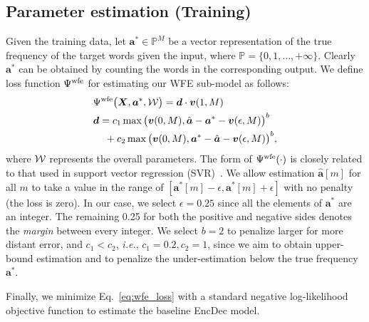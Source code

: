 \documentclass[11pt]{article}
\begin{document}
\subsection{Parameter estimation (Training)}
Given the training data, let $\bm{a}^{*}\in \mathbb{P}^{M}$ be a vector representation of the true frequency of the target words given the input, where $\mathbb{P}=\{0,1,\dots,+\infty\}$. 
Clearly $\bm{a}^{*}$ can be obtained by counting the words in the corresponding output.
We define loss function $ \Psi^{\rm wfe }$ for estimating our WFE sub-model as follows:
\begin{align}
&
 \displaystyle
 \Psi^{\rm wfe } 
 \big(  
 {\bm X},
 \bm{a}^{*}, 
 {\cal W}
 \big)   
 = \displaystyle
 \bm{d}\cdot \bm{v}(1,M)
\label{eq:wfe_loss}
 \\
 &
 \bm{d}
 =
 c_1 \max\big(\bm{v}(0,M), 
 \hat{\bm{a}}
 -
 \bm{a}^{*} 
 - \bm{v}(\epsilon,M)
 \big)^{b}
 \nonumber\\
 &
\,\,\,\,\,\,\, +
 c_2\max\big(\bm{v}(0,M), 
 \bm{a}^{*} 
 -
 \hat{\bm{a}}
 - \bm{v}(\epsilon,M)
 \big)^{b}
 ,
 \nonumber
\end{align}
where $ {\cal W}$ represents the overall parameters.
The form of $\Psi^{\rm wfe}(\cdot)$ is closely related to that used in support vector regression (SVR)~\cite{smola2004tutorial}.
We allow estimation $\hat{\bm{a}}[m]$ for all $m$ to take a value in the range of $[\bm{a}^{*}[m]-\epsilon, \bm{a}^{*}[m]+\epsilon]$ with no penalty (the loss is zero).
In our case, we select $\epsilon=0.25$ since all the elements of $\bm{a}^{*}$ are an integer.
The remaining 0.25 for both the positive and negative sides denotes the {\it margin} between every integer.
We select $b=2$ to penalize larger for more distant error, and $c_1 \!<\! c_2$, {\it i.e.}, $c_1\!=\!0.2, c_2\!=\!1$, since we aim to obtain upper-bound estimation and to penalize the under-estimation below the true frequency $\bm{a}^*$.
   


Finally, we minimize Eq.~\ref{eq:wfe_loss} with a standard negative log-likelihood objective function to estimate the baseline EncDec model.
\end{document}
